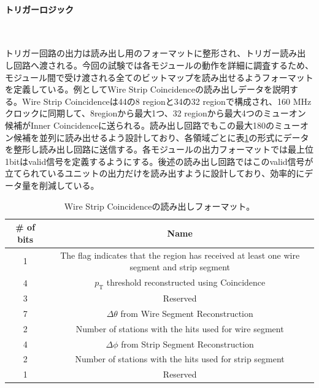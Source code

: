 \paragraph{トリガーロジック}　　
\par
トリガー回路の出力は読み出し用のフォーマットに整形され、トリガー読み出し回路へ渡される。今回の試験では各モジュールの動作を詳細に調査するため、モジュール間で受け渡される全てのビットマップを読み出せるようフォーマットを定義している。例としてWire Strip Coincidenceの読み出しデータを説明する。Wire Strip Coincidenceは44の8 regionと34の32 regionで構成され、160 MHzクロックに同期して、8regionから最大1つ、32 regionから最大4つのミューオン候補がInner Coincidenceに送られる。読み出し回路でもこの最大180のミューオン候補を並列に読み出せるよう設計しており、各領域ごとに表\ref{tab:WS_format}の形式にデータを整形し読み出し回路に送信する。各モジュールの出力フォーマットでは最上位1bitはvalid信号を定義するようにする。後述の読み出し回路ではこのvalid信号が立てられているユニットの出力だけを読み出すように設計しており、効率的にデータ量を削減している。

\begin{table}[]
    \centering
    \caption[Wire Strip Coincidenceの読み出しフォーマット]{Wire Strip Coincidenceの読み出しフォーマット。}
    \label{tab:WS_format}
    \begin{tabular}{|c|c|}
    \hline
    \# of bits & Name                                                                                        \\ \hline\hline
    1          & The flag indicates that the region has received at least one wire segment and strip segment \\ \hline
    4          & $p_{\mathrm{T}}$ threshold reconstructed using Coincidence                                  \\ \hline
    3          & Reserved                                                                                    \\ \hline
    7          & $\Delta\theta$ from Wire Segment Reconstruction                                             \\ \hline
    2          & Number of stations with the hits used for wire segment                                      \\ \hline
    4          & $\Delta\phi$ from Strip Segment Reconstruction                                              \\ \hline
    2          & Number of stations with the hits used for strip segment                                     \\ \hline
    1          & Reserved                                                                                    \\ \hline
    \end{tabular}
\end{table}


